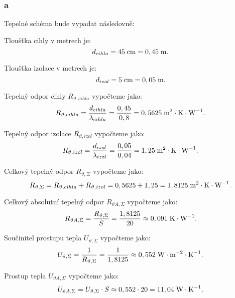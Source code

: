 \documentclass{article}
\begin{document}
\subsubsection{a}
Tepelné schéma bude vypadat následovně:
\begin{center}
\end{center}

Tloušťka cihly v metrech je:
$$
    d_{cihla} = 45 \; \textrm{cm} = 0,45 \; \textrm{m}.
$$

Tloušťka izolace v metrech je:
$$
    d_{izol} = 5 \; \textrm{cm} = 0,05 \; \textrm{m}.
$$

Tepelný odpor cihly $R_{\vartheta,cihla}$ vypočteme jako:
$$
    R_{\vartheta,cihla} = \frac{d_{cihla}}{\lambda_{cihla}} = \frac{0,45}{0,8} = 0,5625 \; \textrm{m}^{\textrm{2}} \cdot \textrm{K} \cdot \textrm{W}^{-1}.
$$

Tepelný odpor izolace $R_{\vartheta,izol}$ vypočteme jako:
$$
    R_{\vartheta,izol} = \frac{d_{izol}}{\lambda_{izol}} = \frac{0,05}{0,04} = 1,25 \; \textrm{m}^{\textrm{2}} \cdot \textrm{K} \cdot \textrm{W}^{-1}.
$$

Celkový tepelný odpor $R_{\vartheta,\Sigma}$ vypočteme jako:
$$
    R_{\vartheta,\Sigma} = R_{\vartheta,cihla} + R_{\vartheta,izol} = 0,5625 + 1,25 = 1,8125 \; \textrm{m}^{\textrm{2}} \cdot \textrm{K} \cdot \textrm{W}^{-1}.
$$

Celkový absolutní tepelný odpor $R_{\vartheta A,\Sigma}$ vypočteme jako:
$$
    R_{\vartheta A,\Sigma} = \frac{R_{\vartheta,\Sigma}}{S} = \frac{1,8125}{20} \approx 0,091 \; \textrm{K} \cdot \textrm{W}^{-1}.
$$

Součinitel prostupu tepla $U_{\vartheta,\Sigma}$ vypočteme jako:
$$
    U_{\vartheta,\Sigma} = \frac{1}{R_{\vartheta,\Sigma}} = \frac{1}{1,8125} \approx 0,552 \; \textrm{W} \cdot \textrm{m}^{-2} \cdot \textrm{K}^{-1}.
$$

Prostup tepla $U_{\vartheta A,\Sigma}$ vypočteme jako:
$$
    U_{\vartheta A,\Sigma} = U_{\vartheta,\Sigma} \cdot S \approx 0,552 \cdot 20 = 11,04 \; \textrm{W} \cdot \textrm{K}^{-1}.
$$
\end{document}
